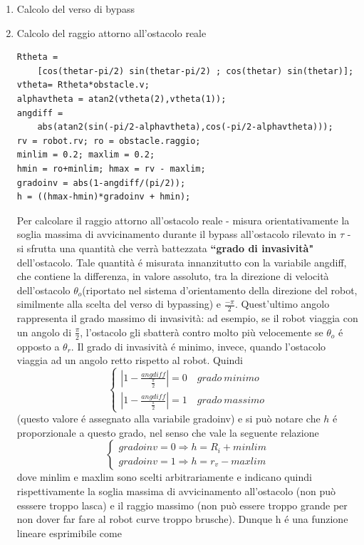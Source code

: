 \documentclass[14pt,a4paper]{extarticle}
\begin{document}
\begin{enumerate}
\item Calcolo del verso di bypass
\item Calcolo del raggio attorno all'ostacolo reale
\begin{lstlisting}[caption=Istruzioni per calcolare h]
Rtheta = 
	[cos(thetar-pi/2) sin(thetar-pi/2) ; cos(thetar) sin(thetar)];
vtheta= Rtheta*obstacle.v;
alphavtheta = atan2(vtheta(2),vtheta(1));
angdiff = 
	abs(atan2(sin(-pi/2-alphavtheta),cos(-pi/2-alphavtheta)));
rv = robot.rv; ro = obstacle.raggio;
minlim = 0.2; maxlim = 0.2;
hmin = ro+minlim; hmax = rv - maxlim;
gradoinv = abs(1-angdiff/(pi/2));
h = ((hmax-hmin)*gradoinv + hmin);
\end{lstlisting}
Per calcolare il raggio attorno all'ostacolo reale - misura orientativamente la soglia massima di avvicinamento durante il bypass all'ostacolo rilevato in \(\tau\) - si sfrutta una quantità che verrà battezzata \textbf{``grado di invasività"} dell'ostacolo. Tale quantità é misurata innanzitutto con la variabile angdiff, che contiene la differenza, in valore assoluto, tra la direzione di velocità dell'ostacolo \(\theta_o\)(riportato nel sistema d'orientamento della direzione del robot, similmente alla scelta del verso di bypassing) e \(\frac{-\pi}{2}\). Quest'ultimo angolo rappresenta il grado massimo di invasività: ad esempio, se il robot viaggia con un angolo di \(\frac{\pi}{2}\), l'ostacolo gli sbatterà contro molto più velocemente se \(\theta_o\) é opposto a \(\theta_r\). Il grado di invasività é minimo, invece, quando l'ostacolo viaggia ad un angolo retto rispetto al robot. Quindi 
\[
\begin{cases}
|1 - \frac{angdiff}{\frac{\pi}{2}}| = 0 \quad grado \ minimo \\
|1 - \frac{angdiff}{\frac{\pi}{2}}| = 1 \quad grado \ massimo
\end{cases}
\]
(questo valore é assegnato alla variabile gradoinv) e si può notare che \(h\) é proporzionale a questo grado, nel senso che vale la seguente relazione
\[
\begin{cases}
gradoinv = 0 \Rightarrow h = R_i + minlim \\
gradoinv = 1 \Rightarrow h = r_v - maxlim
\end{cases}
\]
dove minlim e maxlim sono scelti arbitrariamente e indicano quindi rispettivamente la soglia massima di avvicinamento all'ostacolo (non può esssere troppo lasca) e il raggio massimo (non può essere troppo grande per non dover far fare al robot curve troppo brusche). Dunque h é una funzione lineare esprimibile come 

\end{enumerate}
\end{document}
